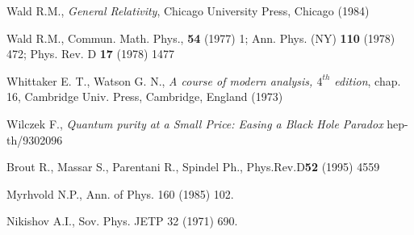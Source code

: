 \documentclass[12pt,oneside]{report}
\begin{document}
\begin{thebibliography}{999}
Wald R.M., {\em General Relativity}, Chicago University Press,
Chicago (1984)

 Wald R.M., Commun. Math. Phys., {\bf 54} (1977) 1;
Ann. Phys. (NY) {\bf 110} (1978) 472;
Phys. Rev. D {\bf 17} (1978) 1477


Whittaker E. T., Watson G. N., {\em A course of modern analysis,
 $4^{th}$ edition}, chap. 16, Cambridge Univ. Press, Cambridge, England (1973)

 Wilczek F., {\em Quantum purity at a Small Price: Easing a Black Hole
Paradox}  hep-th/9302096

 Brout R., Massar S., Parentani R., Spindel Ph.,  Phys.Rev.D{\bf 52} (1995) 4559 

 Myrhvold  N.P., Ann. of Phys. 160 (1985) 102.

 Nikishov A.I., Sov. Phys. JETP 32 (1971) 690.

\end{thebibliography}







\end{document}
